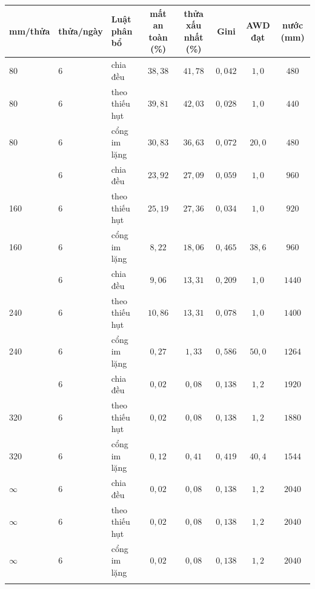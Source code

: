 
\begin{tabular}{@{}lllccccc@{}}
\toprule
mm/thửa & thửa/ngày & Luật phân bổ & mất an toàn (\%) & thửa xấu nhất (\%) & Gini & AWD đạt & nước (mm) \\
\midrule
80 & 6 & chia đều & $38{,}38$ & $41{,}78$ & $0{,}042$ & $1{,}0$ & $480$ \\
80 & 6 & theo thiếu hụt & $39{,}81$ & $42{,}03$ & $0{,}028$ & $1{,}0$ & $440$ \\
80 & 6 & cổng im lặng & $30{,}83$ & $36{,}63$ & $0{,}072$ & $20{,}0$ & $480$ \\
\addlinespace[2pt]
160 & 6 & chia đều & $23{,}92$ & $27{,}09$ & $0{,}059$ & $1{,}0$ & $960$ \\
160 & 6 & theo thiếu hụt & $25{,}19$ & $27{,}36$ & $0{,}034$ & $1{,}0$ & $920$ \\
160 & 6 & cổng im lặng & $8{,}22$ & $18{,}06$ & $0{,}465$ & $38{,}6$ & $960$ \\
\addlinespace[2pt]
240 & 6 & chia đều & $9{,}06$ & $13{,}31$ & $0{,}209$ & $1{,}0$ & $1440$ \\
240 & 6 & theo thiếu hụt & $10{,}86$ & $13{,}31$ & $0{,}078$ & $1{,}0$ & $1400$ \\
240 & 6 & cổng im lặng & $0{,}27$ & $1{,}33$ & $0{,}586$ & $50{,}0$ & $1264$ \\
\addlinespace[2pt]
320 & 6 & chia đều & $0{,}02$ & $0{,}08$ & $0{,}138$ & $1{,}2$ & $1920$ \\
320 & 6 & theo thiếu hụt & $0{,}02$ & $0{,}08$ & $0{,}138$ & $1{,}2$ & $1880$ \\
320 & 6 & cổng im lặng & $0{,}12$ & $0{,}41$ & $0{,}419$ & $40{,}4$ & $1544$ \\
\addlinespace[2pt]
$\infty$ & 6 & chia đều & $0{,}02$ & $0{,}08$ & $0{,}138$ & $1{,}2$ & $2040$ \\
$\infty$ & 6 & theo thiếu hụt & $0{,}02$ & $0{,}08$ & $0{,}138$ & $1{,}2$ & $2040$ \\
$\infty$ & 6 & cổng im lặng & $0{,}02$ & $0{,}08$ & $0{,}138$ & $1{,}2$ & $2040$ \\
\addlinespace[2pt]
\bottomrule
\end{tabular}

